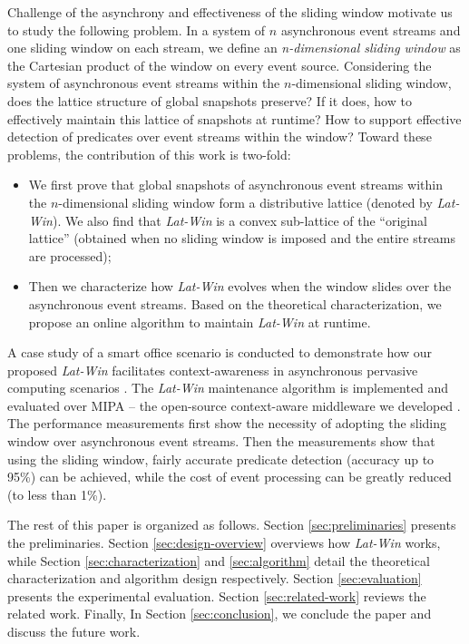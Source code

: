 \documentclass[12pt,journal,letterpaper,compsoc]{IEEEtran}
\begin{document}
Challenge of the asynchrony and effectiveness of the sliding window motivate us to study the following problem. In a system of $n$ asynchronous event streams and one sliding window on each stream, we define an {\it n-dimensional sliding window} as the Cartesian product of the window on every event source. Considering the system of asynchronous event streams within the $n$-dimensional sliding window, does the lattice structure of global snapshots preserve? If it does, how to effectively maintain this lattice of snapshots at runtime? How to support effective detection of predicates over event streams within the window? Toward these problems, the contribution of this work is two-fold:
\begin{itemize}
  \item We first prove that global snapshots of asynchronous event streams within the $n$-dimensional sliding window form a distributive lattice (denoted by {\it Lat-Win}). We also find that {\it Lat-Win} is a convex sub-lattice of the ``original lattice'' (obtained when no sliding window is imposed and the entire streams are processed);
  \item Then we characterize how {\it Lat-Win} evolves when the window slides over the asynchronous event streams. Based on the theoretical characterization, we propose an online algorithm to maintain {\it Lat-Win} at runtime.
\end{itemize}

A case study of a smart office scenario is conducted to demonstrate how our proposed {\it Lat-Win} facilitates context-awareness in asynchronous pervasive computing scenarios \cite{Huang09, Huang11}. The {\it Lat-Win} maintenance algorithm is implemented and evaluated over MIPA -- the open-source context-aware middleware we developed \cite{MIPA, Huang10b, Huang11}. The performance measurements first show the necessity of adopting the sliding window over asynchronous event streams. Then the measurements show that using the sliding window, fairly accurate predicate detection (accuracy up to 95\%) can be achieved, while the cost of event processing can be greatly reduced (to less than 1\%).

The rest of this paper is organized as follows. Section \ref{sec:preliminaries} presents the preliminaries. Section \ref{sec:design-overview} overviews how {\it Lat-Win} works, while Section \ref{sec:characterization} and \ref{sec:algorithm} detail the theoretical characterization and algorithm design respectively. Section \ref{sec:evaluation} presents the experimental evaluation. Section \ref{sec:related-work} reviews the related work. Finally, In Section \ref{sec:conclusion}, we conclude the paper and discuss the future work.
\end{document}
